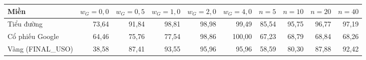 \begin{tabular}{lrrrrrrrrr}
\toprule
Miền & $w_G{=}0{,}0$ & $w_G{=}0{,}5$ & $w_G{=}1{,}0$ & $w_G{=}2{,}0$ & $w_G{=}4{,}0$ & $n{=}5$ & $n{=}10$ & $n{=}20$ & $n{=}40$ \\
\midrule
Tiểu đường & 73{,}64 & 91{,}84 & 98{,}81 & 98{,}98 & 99{,}49 & 85{,}54 & 95{,}75 & 96{,}77 & 97{,}19 \\
Cổ phiếu Google & 64{,}46 & 75{,}76 & 77{,}54 & 98{,}86 & 100{,}00 & 67{,}23 & 68{,}79 & 68{,}84 & 68{,}26 \\
Vàng (FINAL\_USO) & 38{,}58 & 87{,}41 & 93{,}55 & 95{,}96 & 95{,}96 & 58{,}59 & 80{,}30 & 87{,}88 & 92{,}42 \\
\bottomrule
\end{tabular}
